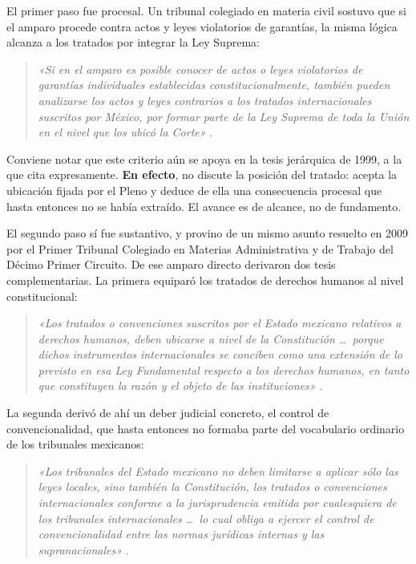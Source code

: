 \documentclass[
  spanish,
  letterpaper, oneside
]{article}
\begin{document}
El primer paso fue procesal. Un tribunal colegiado en materia civil sostuvo que si el amparo procede contra actos y leyes violatorios de garantías, la misma lógica alcanza a los tratados por integrar la Ley Suprema:

\begin{quote}
\textit{«Si en el amparo es posible conocer de actos o leyes violatorios de garantías individuales establecidas constitucionalmente, también pueden analizarse los actos y leyes contrarios a los tratados internacionales suscritos por México, por formar parte de la Ley Suprema de toda la Unión en el nivel que los ubicó la Corte»} \citep[tesis I.7o.C.46 K]{scjnTesis169108}.
\end{quote}

Conviene notar que este criterio aún se apoya en la tesis jerárquica de 1999, a la que cita expresamente. \textbf{En efecto}, no discute la posición del tratado: acepta la ubicación fijada por el Pleno y deduce de ella una consecuencia procesal que hasta entonces no se había extraído. El avance es de alcance, no de fundamento.

El segundo paso sí fue sustantivo, y provino de un mismo asunto resuelto en 2009 por el Primer Tribunal Colegiado en Materias Administrativa y de Trabajo del Décimo Primer Circuito. De ese amparo directo derivaron dos tesis complementarias. La primera equiparó los tratados de derechos humanos al nivel constitucional:

\begin{quote}
\textit{«Los tratados o convenciones suscritos por el Estado mexicano relativos a derechos humanos, deben ubicarse a nivel de la Constitución \dots\ porque dichos instrumentos internacionales se conciben como una extensión de lo previsto en esa Ley Fundamental respecto a los derechos humanos, en tanto que constituyen la razón y el objeto de las instituciones»} \citep[tesis XI.1o.A.T.45 K]{scjnTesis164509}.
\end{quote}

La segunda derivó de ahí un deber judicial concreto, el control de convencionalidad, que hasta entonces no formaba parte del vocabulario ordinario de los tribunales mexicanos:

\begin{quote}
\textit{«Los tribunales del Estado mexicano no deben limitarse a aplicar sólo las leyes locales, sino también la Constitución, los tratados o convenciones internacionales conforme a la jurisprudencia emitida por cualesquiera de los tribunales internacionales \dots\ lo cual obliga a ejercer el control de convencionalidad entre las normas jurídicas internas y las supranacionales»} \citep[tesis XI.1o.A.T.47 K]{scjnTesis164611}.
\end{quote}
\end{document}
